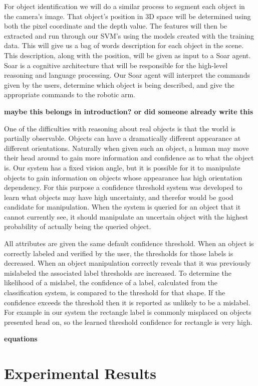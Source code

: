 \documentclass[11pt]{article}
\newcommand{\xxx}[1]{{\bf \color{red} #1}}
\newcommand{\meh}[1]{{\bf \color{blue} #1}}
\begin{document}
For object identification we will do a similar process to segment each object in
the camera's image. That object's position in 3D space will be determined using
both the pixel coordinate and the depth value. The features will then be
extracted and run through our SVM's using the models created with the training
data. This will give us a bag of words description for each object in the scene.
This description, along with the position, will be given as input to a Soar
agent. Soar is a cognitive architecture that will be responsible for the
high-level reasoning and language processing. Our Soar agent will interpret the
commands given by the users, determine which object is being described, and give
the appropriate commands to the robotic arm.

\meh{maybe this belongs in introduction? or did someone already write this}

One of the difficulties with reasoning about real objects is that the world is
partially observable. Objects can have a dramatically different appearance at
different orientations.  Naturally when given such an object, a human may move
their head around to gain more information and confidence as to what the object is.  Our system has a fixed vision angle, but it is possible for it to
manipulate objects to gain information on objects whose appearance has high
orientation dependency.  For this purpose a confidence threshold system was
developed to learn what objects may have high uncertainty, and therefor would
be good candidate for manipulation.  When the system is queried for an object
that it cannot currently see, it should manipulate an uncertain object with the
highest probability of actually being the queried object.

All attributes are given the same default confidence threshold.  When an object
is correctly labeled and verified by the user, the thresholds for those labels
is decreased.  When an object manipulation correctly reveals that it was
previously mislabeled the associated label thresholds are increased.  To
determine the likelihood of a mislabel, the confidence of a label, calculated
from the classification system, is compared to the threshold for that shape.
If the confidence exceeds the threshold then it is reported as unlikely to be a
mislabel.  For example in our system the rectangle label is commonly misplaced
on objects presented head on, so the learned threshold confidence for rectangle
is very high.

\xxx{equations}
\section{Experimental Results}
\end{document}
